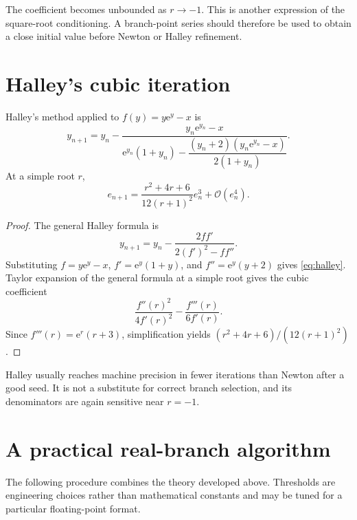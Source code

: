 \documentclass[11pt,openany]{book}
\newcommand{\e}{\mathrm{e}}
\newcommand{\bigO}{\mathcal{O}}
\theoremstyle{plain}
\theoremstyle{definition}
\theoremstyle{remark}
\begin{document}
The coefficient becomes unbounded as \(r\to-1\).  This is another expression
of the square-root conditioning.  A branch-point series should therefore be
used to obtain a close initial value before Newton or Halley refinement.

\section{Halley's cubic iteration}
Halley's method applied to \(f(y)=y\e^y-x\) is
\begin{equation}\label{eq:halley}
 y_{n+1}=y_n-
 \frac{y_n\e^{y_n}-x}
 {\e^{y_n}(1+y_n)-
  \dfrac{(y_n+2)(y_n\e^{y_n}-x)}{2(1+y_n)}}.
\end{equation}
At a simple root \(r\),
\begin{equation}\label{eq:halleyerror}
 e_{n+1}=\frac{r^2+4r+6}{12(r+1)^2}e_n^3
 +\bigO(e_n^4).
\end{equation}

\begin{proof}
The general Halley formula is
\[
 y_{n+1}=y_n-
 \frac{2ff'}{2(f')^2-ff''}.
\]
Substituting
\(f=y\e^y-x\), \(f'=\e^y(1+y)\), and
\(f''=\e^y(y+2)\) gives \eqref{eq:halley}.  Taylor expansion of the general
formula at a simple root gives the cubic coefficient
\[
 \frac{f''(r)^2}{4f'(r)^2}-\frac{f'''(r)}{6f'(r)}.
\]
Since \(f'''(r)=\e^r(r+3)\), simplification yields
\((r^2+4r+6)/(12(r+1)^2)\).
\end{proof}

Halley usually reaches machine precision in fewer iterations than Newton after
a good seed.  It is not a substitute for correct branch selection, and its
denominators are again sensitive near \(r=-1\).

\section{A practical real-branch algorithm}
The following procedure combines the theory developed above.  Thresholds are
engineering choices rather than mathematical constants and may be tuned for a
particular floating-point format.
\end{document}
